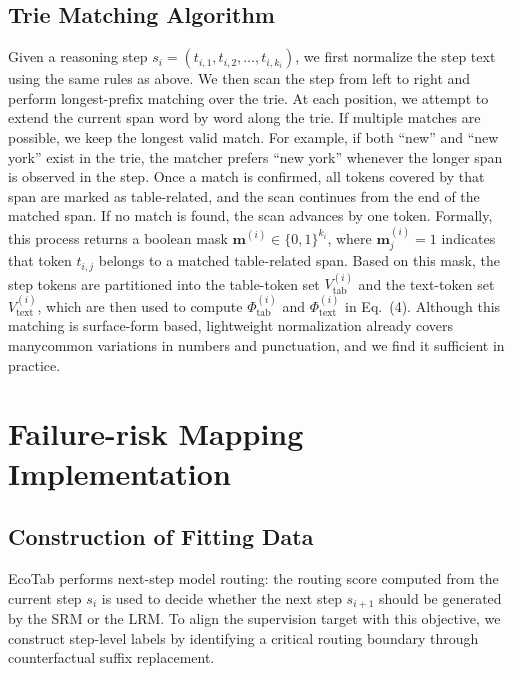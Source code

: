 \documentclass[11pt]{article}
\begin{document}
\subsection{Trie Matching Algorithm}

Given a reasoning step $s_i = (t_{i,1}, t_{i,2}, \dots, t_{i,k_i})$, we first normalize the step text using the same rules as above. We then scan the step from left to right and perform longest-prefix matching over the trie.
At each position, we attempt to extend the current span word by word along the trie. If multiple matches are possible, we keep the longest valid match. For example, if both ``new'' and ``new york'' exist in the trie, the matcher prefers ``new york'' whenever the longer span is observed in the step. Once a match is confirmed, all tokens covered by that span are marked as table-related, and the scan continues from the end of the matched span. If no match is found, the scan advances by one token.
Formally, this process returns a boolean mask $\mathbf{m}^{(i)} \in \{0,1\}^{k_i}$, where $\mathbf{m}^{(i)}_j = 1$ indicates that token $t_{i,j}$ belongs to a matched table-related span. Based on this mask, the step tokens are partitioned into the table-token set $V_{\text{tab}}^{(i)}$ and the text-token set $V_{\text{text}}^{(i)}$, which are then used to compute $\Phi_{\text{tab}}^{(i)}$ and $\Phi_{\text{text}}^{(i)}$ in Eq.~(4). Although this matching is surface-form based, lightweight normalization already covers manycommon variations in numbers and punctuation, and we find it sufficient in practice.

\section{Failure-risk Mapping Implementation}
\label{sec:appendix-risk}

\subsection{Construction of Fitting Data}

EcoTab performs next-step model routing: the routing score computed from the current step $s_i$ is used to decide whether the next step $s_{i+1}$ should be generated by the SRM or the LRM. To align the supervision target with this objective, we construct step-level labels by identifying a critical routing boundary through counterfactual suffix replacement.
\end{document}
